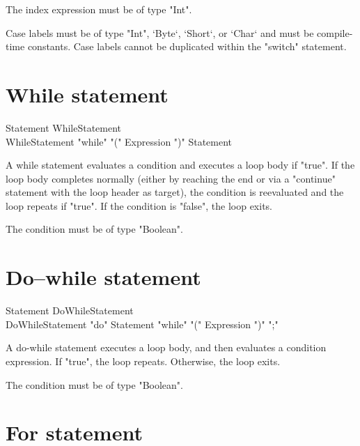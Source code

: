 The index expression must be of type \xcd"Int".

Case labels must be of type \xcd"Int", \xcd`Byte`, \xcd`Short`, or \xcd`Char`
and must be compile-time 
constants.  Case labels cannot be duplicated within the
\xcd"switch" statement.

\section{While statement}

\begin{grammar}
Statement \: WhileStatement \\
WhileStatement \: \xcd"while" \xcd"(" Expression \xcd")" Statement \\
\end{grammar}

A while statement evaluates a condition and executes a loop body
if \xcd"true".  If the loop body completes normally (either by reaching
the end or via a \xcd"continue" statement with the loop header
as target), the condition is reevaluated and the loop repeats if
\xcd"true".  If the condition is \xcd"false", the loop
exits.

The condition must be of type \xcd"Boolean".

\section{Do--while statement}

\begin{grammar}
Statement \: DoWhileStatement \\
DoWhileStatement \: \xcd"do" Statement \xcd"while" \xcd"(" Expression \xcd")" \xcd";" \\
\end{grammar}


A do-while statement executes a loop body, and then evaluates a
condition expression.  If \xcd"true", the loop repeats.
Otherwise, the loop exits.

The condition must be of type \xcd"Boolean".

\section{For statement}

